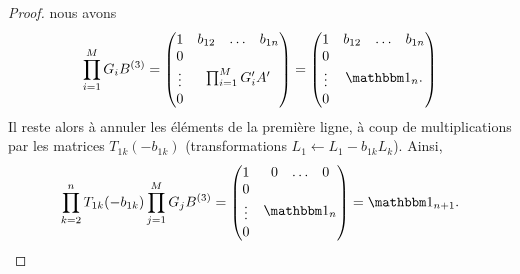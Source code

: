 \begin{proof}
    nous avons
    \begin{equation}
        \prod_{i=1}^MG_iB^{(3)}=
      \begin{pmatrix}
            1    &  
                 \begin{matrix} 
                b_{12}    &   \ldots    &   b_{1n}  
            \end{matrix}\\ 
            \begin{matrix}
                0    \\ 
                \vdots    \\ 
                0    
            \end{matrix}& \prod_{i=1}^MG'_iA'
        \end{pmatrix}
        =
        \begin{pmatrix}
            1    &  
                 \begin{matrix} 
                b_{12}    &   \ldots    &   b_{1n}  
            \end{matrix}\\ 
            \begin{matrix}
                0    \\ 
                \vdots    \\ 
                0    
            \end{matrix}& \mtu_n.
        \end{pmatrix}
    \end{equation}
    Il reste alors à annuler les éléments de la première ligne, à coup de multiplications par les matrices \( T_{1k}(-b_{1k}) \) (transformations \( L_1 \leftarrow L_1 - b_{1k} L_k\)). Ainsi,
     \begin{equation}
        \prod_{k=2}^n T_{1k}(-b_{1k} )
        \prod_{j=1}^M G_j
        B^{(3)}=
      \begin{pmatrix}
            1    &  
                 \begin{matrix} 
                0    &   \ldots    &   0 
            \end{matrix}\\ 
            \begin{matrix}
                0    \\ 
                \vdots    \\ 
                0    
            \end{matrix}& \mtu_n
        \end{pmatrix}
        = \mtu_{n+1}.
    \end{equation}   
\end{proof}

